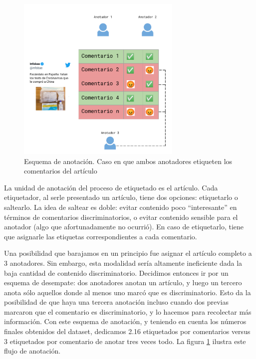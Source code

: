 \begin{figure}
    \centering
    \includegraphics[width=0.7\textwidth]{img/esquema_anotacion.pdf}
    \caption{Esquema de anotación. Caso en que ambos anotadores etiqueten los comentarios del artículo}
    \label{fig:annotation_schema}
\end{figure}

La unidad de anotación del proceso de etiquetado es el artículo. Cada etiquetador, al serle presentado un artículo, tiene dos opciones: etiquetarlo o saltearlo. La idea de saltear es doble: evitar contenido poco ``interesante'' en términos de comentarios discriminatorios, o evitar contenido sensible para el anotador (algo que afortunadamente no ocurrió). En caso de etiquetarlo, tiene que asignarle las etiquetas correspondientes a cada comentario.

Una posibilidad que barajamos en un principio fue asignar el artículo completo a 3 anotadores. Sin embargo, esta modalidad sería altamente ineficiente dada la baja cantidad de contenido discriminatorio. Decidimos entonces ir por un esquema de desempate: dos anotadores anotan un artículo, y luego un tercero anota sólo aquellos donde al menos uno marcó que es discriminatorio. Esto da la posibilidad de que haya una tercera anotación incluso cuando dos previas marcaron que el comentario es discriminatorio, y lo hacemos para recolectar más información. Con este esquema de anotación, y teniendo en cuenta los números finales obtenidos del dataset, dedicamos 2.16 etiquetados por comentarios versus 3 etiquetados por comentario de anotar tres veces todo. La figura \ref{fig:annotation_schema} ilustra este flujo de anotación.


